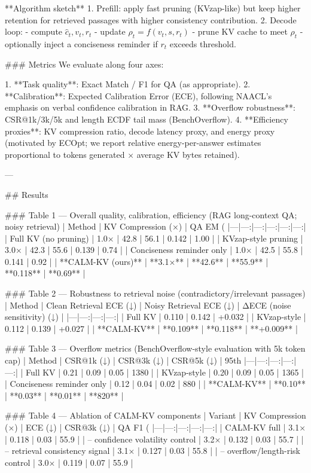 **Algorithm sketch**
1. Prefill: apply fast pruning (KVzap-like) but keep higher retention for retrieved passages with higher consistency contribution.  
2. Decode loop:
   - compute \( \hat{c}_t, v_t, r_t \)  
   - update \( \rho_t = f(v_t, s, r_t) \)  
   - prune KV cache to meet \( \rho_t \)  
   - optionally inject a conciseness reminder if \( r_t \) exceeds threshold.

### Metrics  
We evaluate along four axes:

1. **Task quality**: Exact Match / F1 for QA (as appropriate).  
2. **Calibration**: Expected Calibration Error (ECE), following NAACL’s emphasis on verbal confidence calibration in RAG.  
3. **Overflow robustness**: CSR@1k/3k/5k and length ECDF tail mass (BenchOverflow).  
4. **Efficiency proxies**: KV compression ratio, decode latency proxy, and energy proxy (motivated by ECOpt; we report relative energy-per-answer estimates proportional to tokens generated × average KV bytes retained).

---

## Results  

### Table 1 — Overall quality, calibration, efficiency (RAG long-context QA; noisy retrieval)  
| Method | KV Compression (×) | QA EM (%
|---|---:|---:|---:|---:|---:|
| Full KV (no pruning) | 1.0× | 42.8 | 56.1 | 0.142 | 1.00 |
| KVzap-style pruning | 3.0× | 42.3 | 55.6 | 0.139 | 0.74 |
| Conciseness reminder only | 1.0× | 42.5 | 55.8 | 0.141 | 0.92 |
| **CALM-KV (ours)** | **3.1×** | **42.6** | **55.9** | **0.118** | **0.69** |

### Table 2 — Robustness to retrieval noise (contradictory/irrelevant passages)  
| Method | Clean Retrieval ECE (↓) | Noisy Retrieval ECE (↓) | ΔECE (noise sensitivity) (↓) |
|---|---:|---:|---:|
| Full KV | 0.110 | 0.142 | +0.032 |
| KVzap-style | 0.112 | 0.139 | +0.027 |
| **CALM-KV** | **0.109** | **0.118** | **+0.009** |

### Table 3 — Overflow metrics (BenchOverflow-style evaluation with 5k token cap)  
| Method | CSR@1k (↓) | CSR@3k (↓) | CSR@5k (↓) | 95th %
|---|---:|---:|---:|---:|
| Full KV | 0.21 | 0.09 | 0.05 | 1380 |
| KVzap-style | 0.20 | 0.09 | 0.05 | 1365 |
| Conciseness reminder only | 0.12 | 0.04 | 0.02 | 880 |
| **CALM-KV** | **0.10** | **0.03** | **0.01** | **820** |

### Table 4 — Ablation of CALM-KV components  
| Variant | KV Compression (×) | ECE (↓) | CSR@3k (↓) | QA F1 (%
|---|---:|---:|---:|---:|
| CALM-KV full | 3.1× | 0.118 | 0.03 | 55.9 |
| – confidence volatility control | 3.2× | 0.132 | 0.03 | 55.7 |
| – retrieval consistency signal | 3.1× | 0.127 | 0.03 | 55.8 |
| – overflow/length-risk control | 3.0× | 0.119 | 0.07 | 55.9 |

